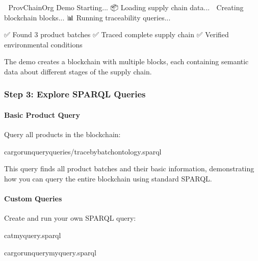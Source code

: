 \documentclass[letterpaper,10pt,english]{sphinxmanual}
\begin{document}
\begin{sphinxVerbatim}[commandchars=\\\{\}]
🚀 ProvChainOrg Demo Starting...
📦 Loading supply chain data...
🔗 Creating blockchain blocks...
📊 Running traceability queries...

✅ Found 3 product batches
✅ Traced complete supply chain
✅ Verified environmental conditions
\end{sphinxVerbatim}

\sphinxAtStartPar
The demo creates a blockchain with multiple blocks, each containing semantic data about different stages of the supply chain.


\subsubsection{Step 3: Explore SPARQL Queries}
\label{\detokenize{user-guide/first-steps:step-3-explore-sparql-queries}}

\paragraph{Basic Product Query}
\label{\detokenize{user-guide/first-steps:basic-product-query}}
\sphinxAtStartPar
Query all products in the blockchain:

\begin{sphinxVerbatim}[commandchars=\\\{\}]
cargorun\PYGZhy{}\PYGZhy{}queryqueries/trace\PYGZus{}by\PYGZus{}batch\PYGZus{}ontology.sparql
\end{sphinxVerbatim}

\sphinxAtStartPar
This query finds all product batches and their basic information, demonstrating how you can query the entire blockchain using standard SPARQL.


\paragraph{Custom Queries}
\label{\detokenize{user-guide/first-steps:custom-queries}}
\sphinxAtStartPar
Create and run your own SPARQL query:

\begin{sphinxVerbatim}[commandchars=\\\{\}]
cat\PYGZgt{}my\PYGZus{}query.sparql


cargorun\PYGZhy{}\PYGZhy{}querymy\PYGZus{}query.sparql
\end{sphinxVerbatim}
\end{document}
